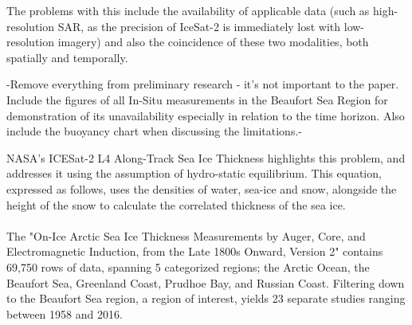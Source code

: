 The problems with this include the availability of applicable data (such as high-resolution SAR, as the precision of IceSat-2 is immediately lost with low-resolution imagery) and also the coincidence of these two modalities, both spatially and temporally.

-Remove everything from preliminary research - it's not important to the paper. Include the figures of all In-Situ measurements in the Beaufort Sea Region for demonstration of its unavailability especially in relation to the time horizon. Also include the buoyancy chart when discussing the limitations.-
\par



NASA's ICESat-2 L4 Along-Track Sea Ice Thickness highlights this problem, and addresses it using the assumption of hydro-static equilibrium. This equation, expressed as follows, uses the densities of water, sea-ice and snow, alongside the height of the snow to calculate the correlated thickness of the sea ice.



\paragraph*{}
The "On-Ice Arctic Sea Ice Thickness Measurements by Auger, Core, and Electromagnetic Induction, from the Late 1800s Onward, Version 2" contains 69,750 rows of data, spanning 5 categorized regions; the Arctic Ocean, the Beaufort Sea, Greenland Coast, Prudhoe Bay, and Russian Coast. Filtering down to the Beaufort Sea region, a region of interest, yields 23 separate studies ranging between 1958 and 2016.
\par


